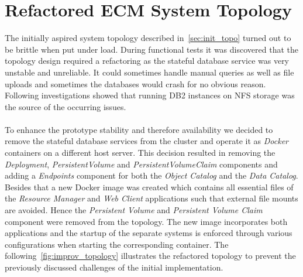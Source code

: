 \section{Refactored ECM System Topology}
The initially aspired system topology described in~\cref{sec:init_topo} turned out to be brittle when put under load.
During functional tests it was discovered that the topology design required a refactoring as the stateful database service was very unstable and unreliable.
It could sometimes handle manual queries as well as file uploads and sometimes the databases would crash for no obvious reason.
Following investigations showed that running DB2 instances on NFS storage was the source of the occurring issues.
\\
\\
To enhance the prototype stability and therefore availability we decided to remove the stateful database services from the cluster and operate it as \textit{Docker} containers on a different host server.
This decision resulted in removing the \textit{Deployment}, \textit{PersistentVolume} and \textit{PersistentVolumeClaim} components and adding a \textit{Endpoints} component for both the \textit{Object Catalog} and the \textit{Data Catalog}.
Besides that a new Docker image was created which contains all essential files of the \textit{Resource Manager} and \textit{Web Client} applications such that external file mounts are avoided.
Hence the \textit{Persistent Volume} and \textit{Persistent Volume Claim} component were removed from the topology.
The new image incorporates both applications and the startup of the separate systems is enforced through various configurations when starting the corresponding container.
The following~\cref{fig:improv_topology} illustrates the refactored topology to prevent the previously discussed challenges of the initial implementation.

